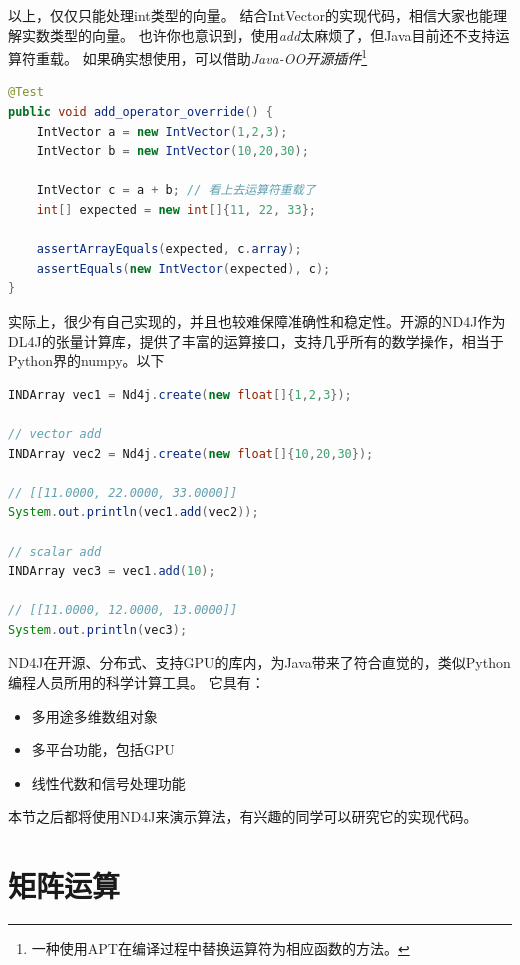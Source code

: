 以上，仅仅只能处理int类型的向量。
结合IntVector的实现代码，相信大家也能理解实数类型的向量。
也许你也意识到，使用\emph{add}太麻烦了，但Java目前还不支持运算符重载。
如果确实想使用，可以借助\emph{Java-OO开源插件}\footnote{一种使用APT在编译过程中替换运算符为相应函数的方法。}
\vspace{0.3cm}

\begin{lstlisting}[language=Java, caption=运算符重载]
@Test
public void add_operator_override() {
    IntVector a = new IntVector(1,2,3);
    IntVector b = new IntVector(10,20,30);

    IntVector c = a + b; // 看上去运算符重载了
    int[] expected = new int[]{11, 22, 33};

    assertArrayEquals(expected, c.array);
    assertEquals(new IntVector(expected), c);
}
\end{lstlisting}

实际上，很少有自己实现的，并且也较难保障准确性和稳定性。开源的ND4J作为DL4J的张量计算库，提供了丰富的运算接口，支持几乎所有的数学操作，相当于Python界的numpy。以下

\begin{lstlisting}[language=Java,caption={dl4j例子},label=code:part2_math_dl4j]
INDArray vec1 = Nd4j.create(new float[]{1,2,3});

// vector add
INDArray vec2 = Nd4j.create(new float[]{10,20,30});

// [[11.0000, 22.0000, 33.0000]]
System.out.println(vec1.add(vec2));

// scalar add
INDArray vec3 = vec1.add(10);

// [[11.0000, 12.0000, 13.0000]]
System.out.println(vec3);
\end{lstlisting}

ND4J在开源、分布式、支持GPU的库内，为Java带来了符合直觉的，类似Python编程人员所用的科学计算工具。
它具有：
\begin{itemize}
\item[1.] 多用途多维数组对象
\item[2.] 多平台功能，包括GPU
\item[3.] 线性代数和信号处理功能
\end{itemize}

\noindent
本节之后都将使用ND4J来演示算法，有兴趣的同学可以研究它的实现代码。

\section{矩阵运算}

